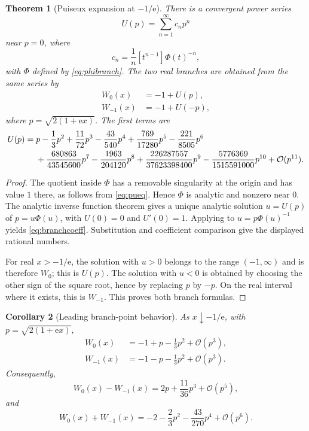 \documentclass[11pt,openany]{book}
\newcommand{\e}{\mathrm{e}}
\newcommand{\Wzero}{W_0}
\newcommand{\Wmone}{W_{-1}}
\newcommand{\bigO}{\mathcal{O}}
\theoremstyle{plain}
\newtheorem{theorem}{Theorem}[chapter]
\newtheorem{corollary}[theorem]{Corollary}
\theoremstyle{definition}
\theoremstyle{remark}
\begin{document}
\begin{theorem}[Puiseux expansion at \(-1/\e\)]\label{thm:puiseux}
There is a convergent power series
\[
             U(p)=\sum_{n=1}^{\infty}c_np^n
\]
near \(p=0\), where
\begin{equation}\label{eq:branchcoeff}
 c_n=\frac1n[t^{n-1}]\Phi(t)^{-n},
\end{equation}
with \(\Phi\) defined by \eqref{eq:phibranch}.  The two real branches are
obtained from the same series by
\begin{align}
 \Wzero(x)&=-1+U(p),\label{eq:w0branchseries}\\
 \Wmone(x)&=-1+U(-p),\label{eq:wm1branchseries}
\end{align}
where \(p=\sqrt{2(1+\e x)}\).  The first terms are
\begin{align}
 U(p)={}&p-\frac13p^2+\frac{11}{72}p^3
 -\frac{43}{540}p^4+\frac{769}{17280}p^5
 -\frac{221}{8505}p^6\notag\\
 &+\frac{680863}{43545600}p^7
 -\frac{1963}{204120}p^8
 +\frac{226287557}{37623398400}p^9
 -\frac{5776369}{1515591000}p^{10}+\bigO(p^{11}).
\label{eq:Ucoefficients}
\end{align}
\end{theorem}

\begin{proof}
The quotient inside \(\Phi\) has a removable singularity at the origin and
has value \(1\) there, as follows from \eqref{eq:pueq}.  Hence \(\Phi\) is
analytic and nonzero near \(0\).  The analytic inverse function theorem gives
a unique analytic solution \(u=U(p)\) of \(p=u\Phi(u)\), with \(U(0)=0\) and
\(U'(0)=1\).  Applying  to
\(u=p\Phi(u)^{-1}\) yields \eqref{eq:branchcoeff}.  Substitution and
coefficient comparison give the displayed rational numbers.

For real \(x>-1/\e\), the solution with \(u>0\) belongs to the range
\((-1,\infty)\) and is therefore \(W_0\); this is \(U(p)\).  The solution
with \(u<0\) is obtained by choosing the other sign of the square root, hence
by replacing \(p\) by \(-p\).  On the real interval where it exists, this is
\(W_{-1}\).  This proves both branch formulas.
\end{proof}

\begin{corollary}[Leading branch-point behavior]\label{cor:branchlead}
As \(x\downarrow-1/\e\), with \(p=\sqrt{2(1+\e x)}\),
\begin{align*}
 \Wzero(x)&=-1+p-\frac13p^2+\bigO(p^3),\\
 \Wmone(x)&=-1-p-\frac13p^2+\bigO(p^3).
\end{align*}
Consequently,
\[
 W_0(x)-W_{-1}(x)=2p+\frac{11}{36}p^3+\bigO(p^5),
\]
and
\[
 W_0(x)+W_{-1}(x)=-2-\frac23p^2-\frac{43}{270}p^4+\bigO(p^6).
\]
\end{corollary}
\end{document}
